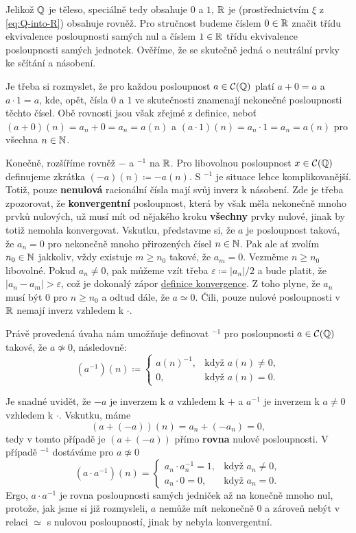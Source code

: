 Jelikož $\mathbb{Q}$ je těleso, speciálně tedy obsahuje $0$ a $1$, $\mathbb{R}$ je
(prostřednictvím $\xi$ z \eqref{eq:Q-into-R}) obsahuje rovněž. Pro stručnost
budeme číslem $0 \in \mathbb{R}$ značit třídu ekvivalence posloupnosti samých nul a
číslem $1 \in \mathbb{R}$ třídu ekvivalence posloupnosti samých jednotek. Ověříme, že se
skutečně jedná o neutrální prvky ke sčítání a násobení.

Je třeba si rozmyslet, že pro každou posloupnost $a \in \mathcal{C}(\mathbb{Q})$ platí
$a + 0 = a$ a $a \cdot 1 = a$, kde, opět, čísla $0$ a $1$ ve skutečnosti
znamenají nekonečné posloupnosti těchto čísel. Obě rovnosti jsou však zřejmé z
definice, neboť $(a+0)(n) = a_n + 0 = a_n = a(n)$ a $(a \cdot 1)(n) = a_n \cdot
1 = a_n = a(n)$ pro všechna $n \in \mathbb{N}$.

Konečně, rozšíříme rovněž $-$ a $^{-1}$ na $\mathbb{R}$. Pro libovolnou posloupnost $x
\in \mathcal{C}(\mathbb{Q})$ definujeme zkrátka $(-a)(n) \coloneqq -a(n)$. S $^{-1}$ je
situace lehce komplikovanější. Totiž, pouze \textbf{nenulová} racionální čísla
mají svůj inverz k násobení. Zde je třeba zpozorovat, že \textbf{konvergentní}
posloupnost, která by však měla nekonečně mnoho prvků nulových, už musí mít od
nějakého kroku \textbf{všechny} prvky nulové, jinak by totiž nemohla
konvergovat. Vskutku, představme si, že $a$ je posloupnost taková, že $a_n = 0$
pro nekonečně mnoho přirozených čísel $n \in \mathbb{N}$. Pak ale ať zvolím $n_0 \in \mathbb{N}$
jakkoliv, vždy existuje $m \geq n_0$ takové, že $a_m = 0$. Vezměme $n \geq n_0$
libovolné. Pokud $a_n \neq 0$, pak můžeme vzít třeba $\varepsilon \coloneqq
|a_n| / 2$ a bude platit, že $|a_n - a_m| > \varepsilon$, což je dokonalý zápor
\hyperref[def:konvergentni-posloupnost]{definice konvergence}. Z toho plyne, že
$a_n$ musí být $0$ pro $n \geq n_0$ a odtud dále, že $a \simeq 0$. Čili, pouze
nulové posloupnosti v $\mathbb{R}$ nemají inverz vzhledem k $ \cdot $.

Právě provedená úvaha nám umožňuje definovat $^{-1}$ pro posloupnosti $a \in
\mathcal{C}(\mathbb{Q})$ takové, že $a \not\simeq 0$, následovně:
\[
 (a^{-1})(n) \coloneqq \begin{cases}
  a(n)^{-1},& \text{když } a(n) \neq 0,\\
  0, &\text{když } a(n) = 0.
 \end{cases}
\]
 
Je snadné uvidět, že $-a$ je inverzem k $a$ vzhledem k $+$ a $a^{-1}$ je
inverzem k $a \neq 0$ vzhledem k $ \cdot $. Vskutku, máme
\[
 (a + (-a))(n) = a_n + (-a_n) = 0,
\]
tedy v tomto případě je $(a + (-a))$ přímo \textbf{rovna} nulové posloupnosti. V
případě $^{-1}$ dostáváme pro $a \not\simeq 0$
\[
 (a \cdot a^{-1})(n) = \begin{cases}
  a_n \cdot a_n^{-1} = 1,& \text{když } a_n \neq 0,\\
  a_n \cdot 0 = 0,& \text{když } a_n = 0.
 \end{cases}
\]
Ergo, $a \cdot a^{-1}$ je rovna posloupnosti samých jedniček až na konečně mnoho
nul, protože, jak jsme si již rozmysleli, $a$ nemůže mít nekonečně $0$ a zároveň
nebýt v relaci $ \simeq $ s nulovou posloupností, jinak by nebyla konvergentní.

